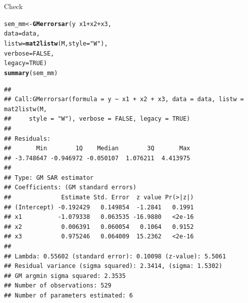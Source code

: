 \documentclass[english,12pt]{book}\usepackage[]{graphicx}\usepackage[]{xcolor}
\makeatletter
\newcommand{\hlnum}[1]{\textcolor[rgb]{0.686,0.059,0.569}{#1}}%
\newcommand{\hlstr}[1]{\textcolor[rgb]{0.192,0.494,0.8}{#1}}%
\newcommand{\hlopt}[1]{\textcolor[rgb]{0,0,0}{#1}}%
\newcommand{\hlstd}[1]{\textcolor[rgb]{0.345,0.345,0.345}{#1}}%
\newcommand{\hlkwb}[1]{\textcolor[rgb]{0.69,0.353,0.396}{#1}}%
\newcommand{\hlkwc}[1]{\textcolor[rgb]{0.333,0.667,0.333}{#1}}%
\newcommand{\hlkwd}[1]{\textcolor[rgb]{0.737,0.353,0.396}{\textbf{#1}}}%
\newenvironment{kframe}{%
 \def\at@end@of@kframe{}%
 \ifinner\ifhmode%
  \def\at@end@of@kframe{\end{minipage}}%
  \begin{minipage}{\columnwidth}%
 \fi\fi%
 \def\FrameCommand##1{\hskip\@totalleftmargin \hskip-\fboxsep
 \colorbox{shadecolor}{##1}\hskip-\fboxsep
     \hskip-\linewidth \hskip-\@totalleftmargin \hskip\columnwidth}%
 \MakeFramed {\advance\hsize-\width
   \@totalleftmargin\z@ \linewidth\hsize
   \@setminipage}}%
 {\par\unskip\endMakeFramed%
 \at@end@of@kframe}
\newenvironment{knitrout}{}{} %
\makeatother
\begin{document}
Check
\begin{knitrout}
\color{fgcolor}\begin{kframe}
\begin{alltt}
\hlstd{sem_mm}    \hlkwb{<-} \hlkwd{GMerrorsar}\hlstd{(y} \hlopt{~} \hlstd{x1} \hlopt{+} \hlstd{x2} \hlopt{+} \hlstd{x3,}
                        \hlkwc{data} \hlstd{= data,}
                        \hlkwc{listw} \hlstd{=} \hlkwd{mat2listw}\hlstd{(M,} \hlkwc{style} \hlstd{=} \hlstr{"W"}\hlstd{),}
                        \hlkwc{verbose} \hlstd{=} \hlnum{FALSE}\hlstd{,}
                        \hlkwc{legacy} \hlstd{=}  \hlnum{TRUE}\hlstd{)}
\hlkwd{summary}\hlstd{(sem_mm)}
\end{alltt}
\begin{verbatim}
## 
## Call:GMerrorsar(formula = y ~ x1 + x2 + x3, data = data, listw = mat2listw(M, 
##     style = "W"), verbose = FALSE, legacy = TRUE)
## 
## Residuals:
##       Min        1Q    Median        3Q       Max 
## -3.748647 -0.946972 -0.050107  1.076211  4.413975 
## 
## Type: GM SAR estimator
## Coefficients: (GM standard errors) 
##              Estimate Std. Error  z value Pr(>|z|)
## (Intercept) -0.192429   0.149854  -1.2841   0.1991
## x1          -1.079338   0.063535 -16.9880   <2e-16
## x2           0.006391   0.060054   0.1064   0.9152
## x3           0.975246   0.064009  15.2362   <2e-16
## 
## Lambda: 0.55602 (standard error): 0.10098 (z-value): 5.5061
## Residual variance (sigma squared): 2.3414, (sigma: 1.5302)
## GM argmin sigma squared: 2.3535
## Number of observations: 529 
## Number of parameters estimated: 6
\end{verbatim}
\end{kframe}
\end{knitrout}
\end{document}
